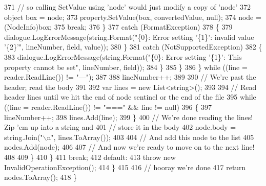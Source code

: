 \begin{DoxyCode}
371                                         \textcolor{comment}{// so calling SetValue using 'node' would just modify a copy of
       'node'}
372                                         \textcolor{keywordtype}{object} box = node;
373                                         property.SetValue(box, convertedValue, null);
374                                         node = (NodeInfo)box;
375                                         \textcolor{keywordflow}{break};
376                                     \}
377                                     \textcolor{keywordflow}{catch} (FormatException)
378                                     \{
379                                         dialogue.LogErrorMessage(string.Format(\textcolor{stringliteral}{"\{0\}: Error setting '\{1\}':
       invalid value '\{2\}'"}, lineNumber, field, value));
380                                     \}
381                                     \textcolor{keywordflow}{catch} (NotSupportedException)
382                                     \{
383                                         dialogue.LogErrorMessage(string.Format(\textcolor{stringliteral}{"\{0\}: Error setting '\{1\}':
       This property cannot be set"}, lineNumber, field));
384                                     \}
385                                 \}
386                             \} \textcolor{keywordflow}{while} ((line = reader.ReadLine()) != \textcolor{stringliteral}{"---"});
387 
388                             lineNumber++;
389 
390                             \textcolor{comment}{// We're past the header; read the body}
391 
392                             var lines = \textcolor{keyword}{new} List<string>();
393 
394                             \textcolor{comment}{// Read header lines until we hit the end of node sentinel or the end of the
       file}
395                             \textcolor{keywordflow}{while} ((line = reader.ReadLine()) != \textcolor{stringliteral}{"==="} && line != null)
396                             \{
397                                 lineNumber++;
398                                 lines.Add(line);    
399                             \}
400                             \textcolor{comment}{// We're done reading the lines! Zip 'em up into a string and}
401                             \textcolor{comment}{// store it in the body}
402                             node.body = string.Join(\textcolor{stringliteral}{"\(\backslash\)n"}, lines.ToArray());
403 
404                             \textcolor{comment}{// And add this node to the list}
405                             nodes.Add(node);
406 
407                             \textcolor{comment}{// And now we're ready to move on to the next line!}
408                                             
409                         \}
410                     \}
411                     \textcolor{keywordflow}{break};
412                 \textcolor{keywordflow}{default}:
413                     \textcolor{keywordflow}{throw} \textcolor{keyword}{new} InvalidOperationException();
414             \}
415 
416             \textcolor{comment}{// hooray we're done}
417             \textcolor{keywordflow}{return} nodes.ToArray();
418         \}
\end{DoxyCode}
